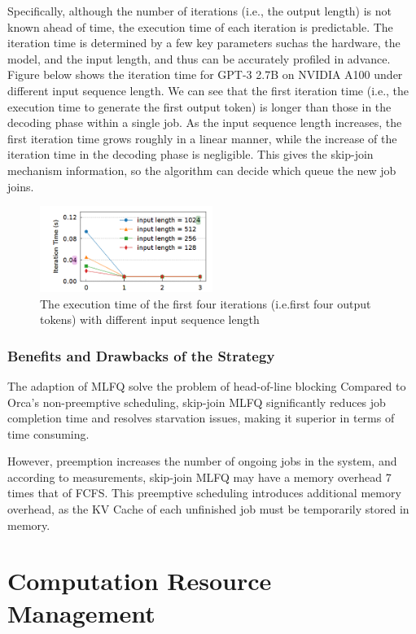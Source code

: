 \documentclass[conference]{IEEEtran}
\begin{document}
Specifically, although the number of iterations (i.e., the output length) is not known ahead of time, the execution time of each iteration is predictable. The iteration time is determined by a few key parameters suchas the hardware, the model, and the input length, and thus
can be accurately profiled in advance. Figure below shows the iteration time for GPT-3 2.7B on NVIDIA A100 under different input sequence length. We can see that the first iteration
time (i.e., the execution time to generate the first output token) is longer than those in the decoding phase within a single job. As the input sequence length increases, the first iteration time grows roughly in a linear manner, while the increase of the iteration time in the decoding phase is negligible. This gives the skip-join mechanism information, so the algorithm can decide which queue the new job joins.

\begin{figure}[htbp]
    \centerline{\includegraphics[width=0.5\textwidth]{process fig5.png}}
    \caption{ The execution time of the first four iterations (i.e.first four output tokens) with different input sequence length}
    \label{fig}
\end{figure}

\subsubsection{Benefits and Drawbacks of the Strategy}

The adaption of MLFQ solve the problem of head-of-line blocking
Compared to Orca's non-preemptive scheduling, skip-join MLFQ significantly reduces job completion time and resolves starvation issues, making it superior in terms of time consuming.

However, preemption increases the number of ongoing jobs in the system, and according to measurements, skip-join MLFQ may have a memory overhead 7 times that of FCFS. This preemptive scheduling introduces additional memory overhead, as the KV Cache of each unfinished job must be temporarily stored in memory.


\section{Computation Resource Management}
\end{document}
